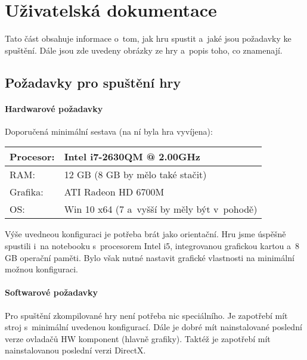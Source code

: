 
\chapter{Uživatelská dokumentace}

Tato část obsahuje informace o~tom, jak hru spustit a~jaké jsou požadavky ke spuštění. Dále jsou zde uvedeny obrázky ze hry a~popis toho, co znamenají. 

\section{Požadavky pro spuštění hry}
\subsubsection{Hardwarové požadavky}

Doporučená minimální sestava (na ní byla hra vyvíjena): 

\begin{center}
	\begin{tabular} { | l | l |}
		\hline
		Procesor: 	&	Intel i7-2630QM @ 2.00GHz \\	\hline
		RAM:		&	12 GB	(8 GB by mělo také stačit) \\	\hline
		Grafika:	&	ATI Radeon HD 6700M \\	\hline
		OS:			&	Win 10 x64	(7 a~vyšší by měly být v~pohodě) \\
		\hline
	\end{tabular}
\end{center}

Výše uvedneou konfiguraci je potřeba brát jako orientační. Hru jsme úspěšně spustili i~na notebooku s~procesorem Intel i5, integrovanou grafickou kartou a~8 GB operační paměti. Bylo však nutné nastavit grafické vlastnosti na minimální možnou konfiguraci. 

\subsubsection{Softwarové požadavky}

Pro spuštění zkompilované hry není potřeba nic speciálního. Je zapotřebí mít stroj s~minimální uvedenou konfigurací. Dále je dobré mít nainstalované poslední verze ovladačů HW komponent (hlavně grafiky).
Taktéž je zapotřebí mít nainstalovanou poslední verzi DirectX. 




%
%
%
%
%
%
%
%
%
%

